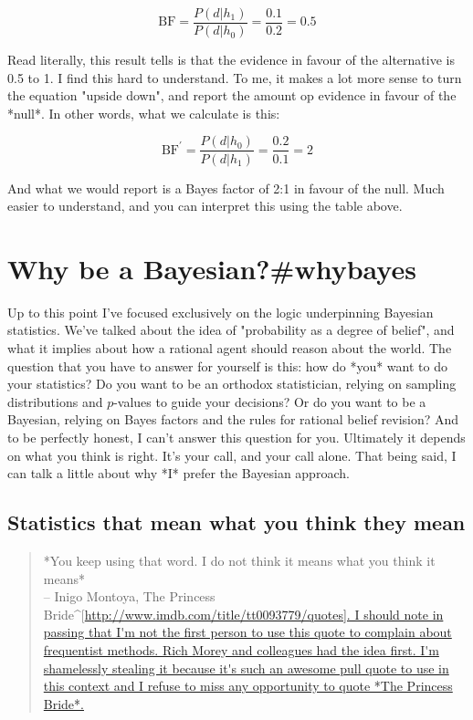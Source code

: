 $$ 
\mbox{BF} = \frac{P(d|h_1)}{P(d|h_0)} = \frac{0.1}{0.2} = 0.5
$$


Read literally, this result tells is that the evidence in favour of the alternative is 0.5 to 1. I find this hard to understand. To me, it makes  a lot more sense to turn the equation "upside down", and report the amount op evidence in favour of the *null*. In other words, what we calculate is this:

$$ 
\mbox{BF}^\prime = \frac{P(d|h_0)}{P(d|h_1)} = \frac{0.2}{0.1} = 2
$$


And what we would report is a Bayes factor of 2:1 in favour of the null. Much easier to understand, and you can interpret this using the table above. 




\section{Why be a Bayesian?{#whybayes}}

Up to this point I've focused exclusively on the logic underpinning Bayesian statistics. We've talked about the idea of "probability as a degree of belief", and what it implies about how a rational agent should reason about the world. The question that you have to answer for yourself is this: how do *you* want to do your statistics? Do you want to be an orthodox statistician, relying on sampling distributions and $p$-values to guide your decisions? Or do you want to be a Bayesian, relying on Bayes factors and the rules for rational belief revision? And to be perfectly honest, I can't answer this question for you. Ultimately it depends on what you think is right. It's your call, and your call alone. That being said, I can talk a little about why *I* prefer the Bayesian approach. 

\subsection{Statistics that mean what you think they mean}

\begin{quote}
*You keep using that word. I do not think it means what you think it means* \\
\hspace*{2cm} -- Inigo Montoya, The Princess Bride^[\url{http://www.imdb.com/title/tt0093779/quotes]. I should note in passing that I'm not the first person to use this quote to complain about frequentist methods. Rich Morey and colleagues had the idea first. I'm shamelessly stealing it because it's such an awesome pull quote to use in this context and I refuse to miss any opportunity to quote *The Princess Bride*.}
\end{quote}

